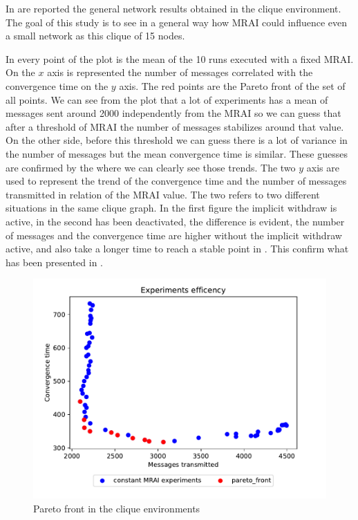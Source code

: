 \documentclass[10pt,conference,letterpaper]{IEEEtran}
\newcommand{\figwidth}{0.78}
\newcommand{\figvspace}{-1.5em}
\begin{document}
In  are reported the general
network results obtained in the clique environment.
The goal of this study is to see in a general way how \ac{MRAI} could influence
even a small network as this clique of \num{15} nodes.

In  every point of the plot is the mean of the \num{10}
runs executed with a fixed \ac{MRAI}.
On the $x$ axis is represented the number of messages correlated with the convergence
time on the $y$ axis.
The red points are the Pareto front of the set of all points.
We can see from the plot that a lot of experiments has a mean of messages sent 
around \num{2000} independently from the \ac{MRAI} so we can guess that after
a threshold of \ac{MRAI} the number of messages stabilizes around that value.
On the other side, before this threshold we can guess there is a lot of variance
in the number of messages but the mean convergence time is similar.
These guesses are confirmed by the  where we can clearly
see those trends.
The two $y$ axis are used to represent the trend of the convergence time and
the number of messages transmitted in relation of the \ac{MRAI} value.
The two  refers
to two different situations in the same clique graph.
In the first figure the implicit withdraw is active, in the second has been
deactivated, the difference is evident, the number of messages and the convergence
time are higher without the implicit withdraw active, and also take a longer time
to reach a stable point in . 
This confirm what has been presented in \cite{labovitz2000delayed}.

\begin{figure}[tb]
	\centering
	\includegraphics[width=\figwidth\columnwidth]{images/clique/pareto-clique-constant}
	\caption{Pareto front in the clique environments}
	\label{fig:clique_pareto_freq}
	\vspace{\figvspace}
\end{figure}
\end{document}
